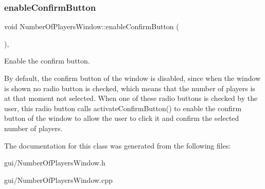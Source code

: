 \subsubsection{\texorpdfstring{enable\+Confirm\+Button}{enableConfirmButton}}
{\footnotesize\ttfamily void Number\+Of\+Players\+Window\+::enable\+Confirm\+Button (\begin{DoxyParamCaption}{ }\end{DoxyParamCaption})\hspace{0.3cm}{\ttfamily [private]}, {\ttfamily [slot]}}



Enable the confirm button. 

By default, the confirm button of the window is disabled, since when the window is shown no radio button is checked, which means that the number of players is at that moment not selected. When one of these radio buttons is checked by the user, this radio button calls activate\+Confirm\+Button() to enable the confirm button of the window to allow the user to click it and confirm the selected number of players. 

The documentation for this class was generated from the following files\+:\begin{DoxyCompactItemize}
\item 
gui/Number\+Of\+Players\+Window.\+h\item 
gui/Number\+Of\+Players\+Window.\+cpp\end{DoxyCompactItemize}
